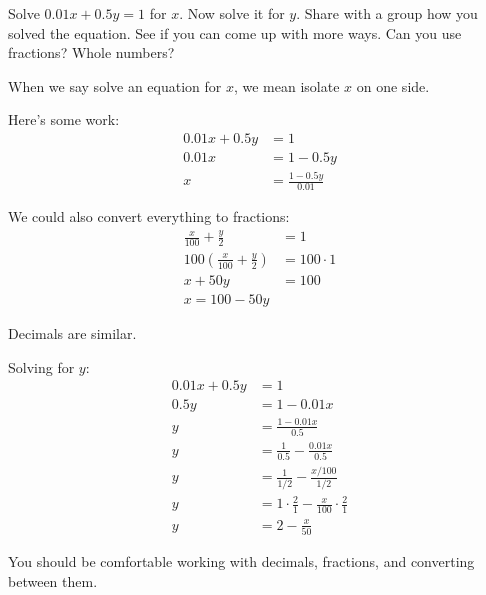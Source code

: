 \documentclass[noauthor]{ximera}
\begin{document}
\begin{problem}
Solve \(0.01x + 0.5y = 1\) for \(x\). Now solve it for \(y\).
Share with a group how you solved the equation. See if you can come up with more ways. Can you use fractions? Whole numbers?

\begin{explanation}
When we say solve an equation for \(x\), we mean isolate \(x\) on one side.

Here's some work:
\begin{align*}
    0.01x + 0.5y & = 1 \\
    0.01x & = 1 - 0.5y \\
    x & = \frac{1 - 0.5y}{0.01}
\end{align*}

We could also convert everything to fractions:
\begin{align*}
    \frac{x}{100} + \frac{y}{2} & = 1 \\
    100\left(\frac{x}{100} + \frac{y}{2}\right) & = 100 \cdot 1 \\
    x + 50y & = 100 \\
    x = 100 - 50y
\end{align*}

Decimals are similar.

Solving for \(y\):
\begin{align*}
    0.01x + 0.5y & = 1 \\
    0.5y & = 1 - 0.01x \\
    y & = \frac{1 -0.01x}{0.5} \\
    y & = \frac{1}{0.5} - \frac{0.01x}{0.5} \\
    y & = \frac{1}{1/2} - \frac{x/100}{1/2} \\
    y & = 1 \cdot \frac{2}{1} - \frac{x}{100}\cdot \frac{2}{1} \\
    y & = 2 - \frac{x}{50}
\end{align*}

You should be comfortable working with decimals, fractions, and converting between them.
\end{explanation}
\end{problem}
\end{document}
